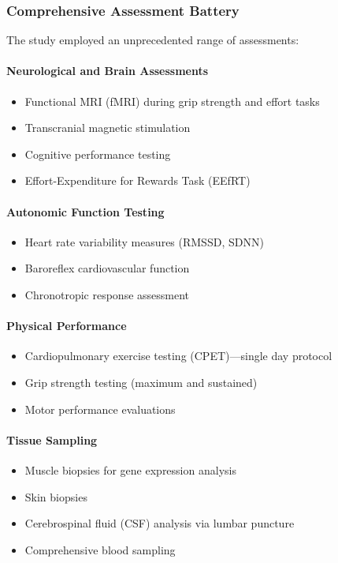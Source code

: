 \subsubsection{Comprehensive Assessment Battery}

The study employed an unprecedented range of assessments:

\paragraph{Neurological and Brain Assessments}
\begin{itemize}
    \item Functional MRI (fMRI) during grip strength and effort tasks
    \item Transcranial magnetic stimulation
    \item Cognitive performance testing
    \item Effort-Expenditure for Rewards Task (EEfRT)
\end{itemize}

\paragraph{Autonomic Function Testing}
\begin{itemize}
    \item Heart rate variability measures (RMSSD, SDNN)
    \item Baroreflex cardiovascular function
    \item Chronotropic response assessment
\end{itemize}

\paragraph{Physical Performance}
\begin{itemize}
    \item Cardiopulmonary exercise testing (CPET)---single day protocol
    \item Grip strength testing (maximum and sustained)
    \item Motor performance evaluations
\end{itemize}

\paragraph{Tissue Sampling}
\begin{itemize}
    \item Muscle biopsies for gene expression analysis
    \item Skin biopsies
    \item Cerebrospinal fluid (CSF) analysis via lumbar puncture
    \item Comprehensive blood sampling
\end{itemize}

